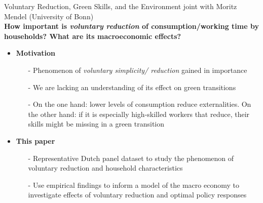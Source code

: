\begin{frame}{Voluntary  Reduction, Green Skills, and the Environment}
		\vspace{-5mm}
	\hspace{-6mm}\footnotesize{joint with Moritz Mendel (University of Bonn)}\\
	
	
	\vspace{3mm}\textbf{\alert{How important is \textit{voluntary reduction} of consumption/working time by households? What are its macroeconomic effects? }}
	\pause
\begin{itemize}[<+->]
\item \textbf{Motivation}
\begin{itemize}
\item[-] Phenomenon of \textit{voluntary simplicity/ reduction} gained in importance  \citep{Reboucas2021VoluntaryAgenda}%
\item[-] We are lacking an understanding of its effect on green transitions
\item[-] On the one hand: lower levels of consumption reduce externalities. On the other hand: if it is especially high-skilled workers that reduce, their skills might be missing in a green transition \citep{Consoli2016DoCapital}
\end{itemize}
\item \textbf{This paper}
\begin{itemize}
	\item[-] Representative Dutch panel dataset to study the phenomenon of voluntary reduction and household characteristics
	\item[-] Use empirical findings to inform a model of the macro economy to investigate effects of voluntary reduction and optimal policy responses
\end{itemize}
\end{itemize}
\end{frame}

